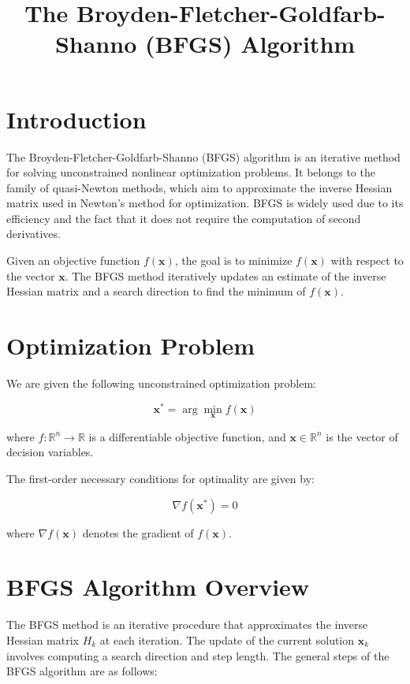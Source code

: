 \documentclass[12pt]{article}
\title{The Broyden-Fletcher-Goldfarb-Shanno (BFGS) Algorithm}
\author{}
\date{}
\begin{document}
\maketitle

\section{Introduction}

The Broyden-Fletcher-Goldfarb-Shanno (BFGS) algorithm is an iterative method for solving unconstrained nonlinear optimization problems. It belongs to the family of quasi-Newton methods, which aim to approximate the inverse Hessian matrix used in Newton's method for optimization. BFGS is widely used due to its efficiency and the fact that it does not require the computation of second derivatives.

Given an objective function \( f(\mathbf{x}) \), the goal is to minimize \( f(\mathbf{x}) \) with respect to the vector \( \mathbf{x} \). The BFGS method iteratively updates an estimate of the inverse Hessian matrix and a search direction to find the minimum of \( f(\mathbf{x}) \).

\section{Optimization Problem}

We are given the following unconstrained optimization problem:

\[
\mathbf{x}^* = \arg \min_{\mathbf{x}} f(\mathbf{x})
\]

where \( f: \mathbb{R}^n \to \mathbb{R} \) is a differentiable objective function, and \( \mathbf{x} \in \mathbb{R}^n \) is the vector of decision variables.

The first-order necessary conditions for optimality are given by:

\[
\nabla f(\mathbf{x}^*) = 0
\]

where \( \nabla f(\mathbf{x}) \) denotes the gradient of \( f(\mathbf{x}) \).

\section{BFGS Algorithm Overview}

The BFGS method is an iterative procedure that approximates the inverse Hessian matrix \( H_k \) at each iteration. The update of the current solution \( \mathbf{x}_k \) involves computing a search direction and step length. The general steps of the BFGS algorithm are as follows:
\end{document}
